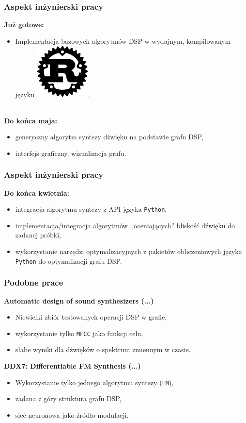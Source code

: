 \documentclass[]{beamer}
\begin{document}
\begin{frame}
  \frametitle{Aspekt inżynierski pracy}

  \textbf{Już gotowe:}
  \begin{itemize}
    \item Implementacja bazowych algorytmów DSP w wydajnym,
      kompilowanym języku \includegraphics[scale=0.45]{rust.jpg}.
  \end{itemize}\\

  \textbf{Do końca maja:}
  \begin{itemize}
    \item generyczny algorytm syntezy dźwięku na podstawie grafu DSP,
    \item interfejs graficzny, wizualizacja grafu.
  \end{itemize}
\end{frame}

\begin{frame}
  \frametitle{Aspekt inżynierski pracy}
  \textbf{Do końca kwietnia:}
  \begin{itemize}
    \item integracja algorytmu syntezy z API języka \texttt{Python},
    \item implementacja/integracja algorytmów ,,oceniających'' bliskość dźwięku do zadanej próbki,
    \item wykorzystanie narzędzi optymalizacyjnych z pakietów obliczeniowych języka \texttt{Python} do optymalizacji grafu DSP.
  \end{itemize}
\end{frame}

\begin{frame}
  \frametitle{Podobne prace}
  \begin{multicols}{2}
    \textbf{Automatic design of sound synthesizers (...) \cite{puredata}}
    \begin{itemize}
      \item Niewielki zbiór testowanych operacji DSP w grafie,
      \item wykorzystanie tylko \texttt{MFCC} jako funkcji celu,
      \item słabe wyniki dla dźwięków o spektrum zmiennym w czasie.
    \end{itemize}

    \textbf{DDX7: Differentiable FM Synthesis (...) \cite{ddx7}}
    \begin{itemize}
      \item Wykorzystanie tylko jednego algorytmu syntezy (\texttt{FM}),
      \item zadana z góry struktura grafu DSP,
      \item sieć neuronowa jako źródło modulacji.
    \end{itemize}
  \end{multicols}
\end{frame}
\end{document}

